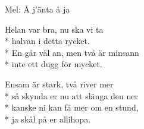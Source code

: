 \begin{SongText}
    \begin{SongInfo}
        Mel: Å j’änta å ja
    \end{SongInfo}
    \begin{SongVerse}
        Helan var bra, nu ska vi ta\\*%
        halvan i detta rycket.\\*%
        En går väl an, men två är minsann\\*%
        inte ett dugg för mycket.
    \end{SongVerse}
    \begin{SongVerse}
        Ensam är stark, två river mer\\*%
        så skynda er nu att slänga den ner\\*%
        kanske ni kan få mer om en stund,\\*%
        ja skål på er allihopa.
    \end{SongVerse}
\end{SongText}
